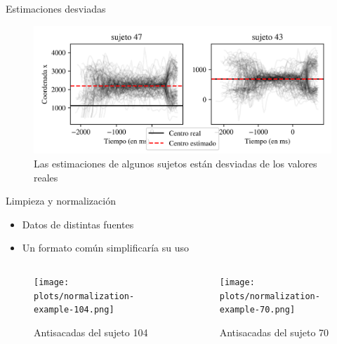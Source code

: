 \documentclass[aspectratio=169]{beamer}
\begin{document}
\begin{frame}{Estimaciones desviadas}
  \begin{figure}
    \centering
    \includegraphics[width=\linewidth]{plots/skewed-estimations-examples.png}
    \caption{Las estimaciones de algunos sujetos están desviadas de los valores reales}
  \end{figure}
\end{frame}

\begin{frame}{Limpieza y normalización}
  \begin{itemize}
    \item Datos de distintas fuentes
    \item Un formato común simplificaría su uso
  \end{itemize}

  \begin{columns}
    \begin{column}{0.5\textwidth}
      \begin{figure}
        \centering
        \texttt{[image: plots/normalization-example-104.png]}
        \caption{Antisacadas del sujeto 104}
      \end{figure}
    \end{column}
    \begin{column}{0.5\textwidth}
      \begin{figure}
        \centering
        \texttt{[image: plots/normalization-example-70.png]}
        \caption{Antisacadas del sujeto 70}
      \end{figure}
    \end{column}
  \end{columns}
\end{frame}
\end{document}
